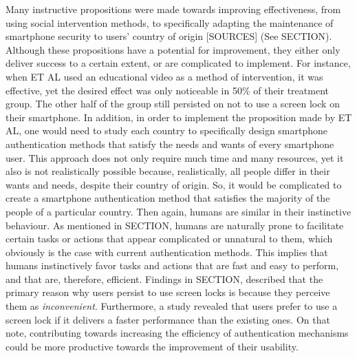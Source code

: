 Many instructive propositions were made towards improving effectiveness, from using social intervention methods, to specifically adapting the maintenance of smartphone security to users' country of origin [SOURCES] (See SECTION). Although these propositions have a potential for improvement, they either only deliver success to a certain extent, or are complicated to implement. For instance, when ET AL used an educational video as a method of intervention, it was effective, yet the desired effect was only noticeable in 50\% of their treatment group. The other half of the group still persisted on not to use a screen lock on their smartphone. In addition, in order to implement the proposition made by ET AL, one would need to study each country to specifically design smartphone authentication methods that satisfy the needs and wants of every smartphone user. This approach does not only require much time and many resources, yet it also is not realistically possible because, realistically, all people differ in their wants and needs, despite their country of origin. So, it would be complicated to create a smartphone authentication method that satisfies the majority of the people of a particular country. Then again, humans are similar in their instinctive behaviour. As mentioned in SECTION, humans are naturally prone to facilitate certain tasks or actions that appear complicated or unnatural to them, which obviously is the case with current authentication methods. This implies that humans instinctively favor tasks and actions that are fast and easy to perform, and that are, therefore, efficient. Findings in SECTION, described that the primary reason why users persist to use screen locks is because they perceive them as \textit{inconvenient}. Furthermore, a study revealed that users prefer to use a screen lock if it delivers a faster performance than the existing ones. On that note, contributing towards increasing the efficiency of authentication mechanisms could be more productive towards the improvement of their usability. \\
